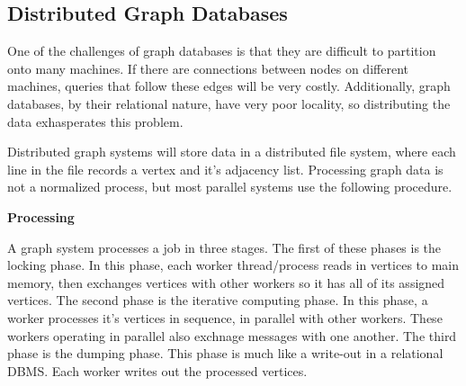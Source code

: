 \subsection*{Distributed Graph Databases}


One of the challenges of graph databases is that they are difficult to partition onto many machines. If there are connections between nodes on different machines, queries that follow these edges will be very costly. Additionally, graph databases, by their relational nature, have very poor locality, so distributing the data exhasperates this problem\cite{parallelgraph}. 



Distributed graph systems will store data in a distributed file system, where each line in the file records a vertex and it's adjacency list. Processing graph data is not a normalized process, but most parallel systems use the following procedure\cite{blogel}.
\par
\textbf{Processing}
\par
A graph system processes a job in three stages.
The first of these phases is the locking phase. In this phase, each worker thread/process reads in vertices to main memory, then exchanges vertices with other workers so it has all of its assigned vertices.
The second phase is the iterative computing phase. In this phase, a worker processes it's vertices in sequence, in parallel with other workers. These workers operating in parallel also exchnage messages with one another.
The third phase is the dumping phase. This phase is much like a write-out in a relational DBMS. Each worker writes out the processed vertices\cite{blogel}\cite{pregel}.